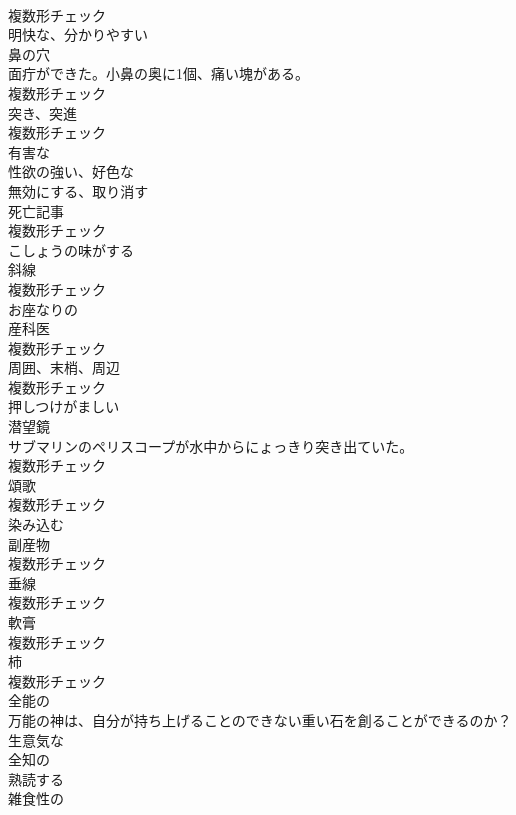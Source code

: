 \documentclass[8pt]{extreport}
\begin{document}
\begin{CJK}{UTF8}{min}
\\	複数形チェック
\\	[形容詞]	明快な、分かりやすい	
\\	[名詞]	鼻の穴	
\\	面疔ができた。小鼻の奥に1個、痛い塊がある。	
\\	複数形チェック
\\	[名詞]	突き、突進	
\\	複数形チェック
\\	[形容詞]	有害な	
\\	[形容詞]	性欲の強い、好色な	
\\	[動詞]	無効にする、取り消す	
\\	[名詞]	死亡記事	
\\	複数形チェック
\\	[形容詞]	こしょうの味がする	
\\	[名詞]	斜線	
\\	複数形チェック
\\	[形容詞]	お座なりの	
\\	[名詞]	産科医	
\\	複数形チェック
\\	[名詞]	周囲、末梢、周辺	
\\	複数形チェック
\\	[形容詞]	押しつけがましい	
\\	[名詞]	潜望鏡	
\\	サブマリンのペリスコープが水中からにょっきり突き出ていた。	
\\	複数形チェック
\\	[名詞]	頌歌	
\\	複数形チェック
\\	[動詞]	染み込む	
\\	[名詞]	副産物	
\\	複数形チェック
\\	[名詞]	垂線	
\\	複数形チェック
\\	[名詞]	軟膏	
\\	複数形チェック
\\	[名詞]	柿	
\\	複数形チェック
\\	[形容詞]	全能の	
\\	万能の神は、自分が持ち上げることのできない重い石を創ることができるのか？	
\\	[形容詞]	生意気な	
\\	[形容詞]	全知の	
\\	[動詞]	熟読する	
\\	[形容詞]	雑食性の	

\end{CJK}
\end{document}
